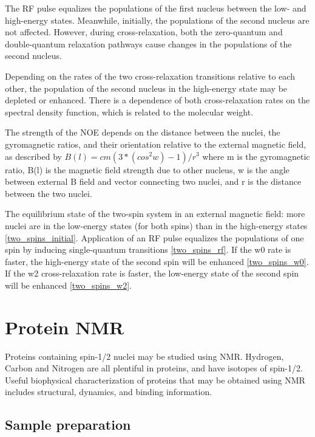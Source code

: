 The RF pulse equalizes the populations of the first nucleus between the low-
and high-energy states.  Meanwhile, initially, the populations of the second
nucleus are not affected.  However, during cross-relaxation, both the zero-quantum
and double-quantum relaxation pathways cause changes in the populations of
the second nucleus.

Depending on the rates of the two cross-relaxation transitions relative to 
each other, the population of the second nucleus in the high-energy state may 
be depleted or enhanced.  There is a dependence of both cross-relaxation
rates on the spectral density function, which is related to the molecular 
weight.  

The strength of the NOE depends on the distance between the nuclei, 
the gyromagnetic ratios, and their orientation relative to the external 
magnetic field, as described by $B(l) = c m (3*(cos^2 w)-1) / r^3$
where 
m    is the gyromagnetic ratio,
B(l) is the magnetic field strength due to other nucleus,
w    is the angle between external B field and vector connecting two nuclei, and
r    is the distance between the two nuclei.

The equilibrium state of the two-spin system in an external magnetic field:
more nuclei are in the low-energy states (for both spins) than in the 
high-energy states \ref{two_spins_initial}.
Application of an RF pulse equalizes the populations of one spin by inducing
single-quantum transitions \ref{two_spins_rf}.
If the w0 rate is faster, the high-energy state of the second spin will be
enhanced \ref{two_spins_w0}.
If the w2 cross-relaxation rate is faster, the low-energy state of the second
spin will be enhanced \ref{two_spins_w2}.



\section{Protein NMR}

Proteins containing spin-1/2 nuclei may be studied using NMR.  Hydrogen, 
Carbon and Nitrogen are all plentiful in proteins, and have isotopes of 
spin-1/2.  Useful biophysical characterization of proteins that may be 
obtained using NMR includes structural, dynamics, and binding information.

\subsection*{Sample preparation}

